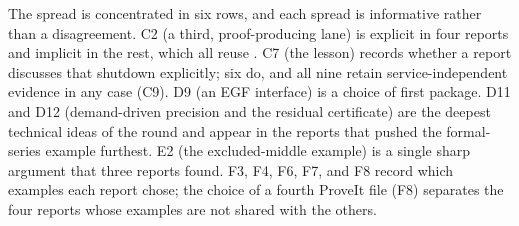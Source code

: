 \documentclass[11pt,a4paper]{article}
\newcommand{\code}[1]{\texttt{\detokenize{#1}}}
\theoremstyle{definition}
\begin{document}
The spread is concentrated in six rows, and each spread is informative rather than a disagreement. C2 (a third, proof-producing lane) is explicit in four reports and implicit in the rest, which all reuse \code{ring}. C7 (the \code{polyrith} lesson) records whether a report discusses that shutdown explicitly; six do, and all nine retain service-independent evidence in any case (C9). D9 (an EGF interface) is a choice of first package. D11 and D12 (demand-driven precision and the residual certificate) are the deepest technical ideas of the round and appear in the reports that pushed the formal-series example furthest. E2 (the excluded-middle example) is a single sharp argument that three reports found. F3, F4, F6, F7, and F8 record which examples each report chose; the choice of a fourth ProveIt file (F8) separates the four reports whose examples are not shared with the others.
\end{document}
